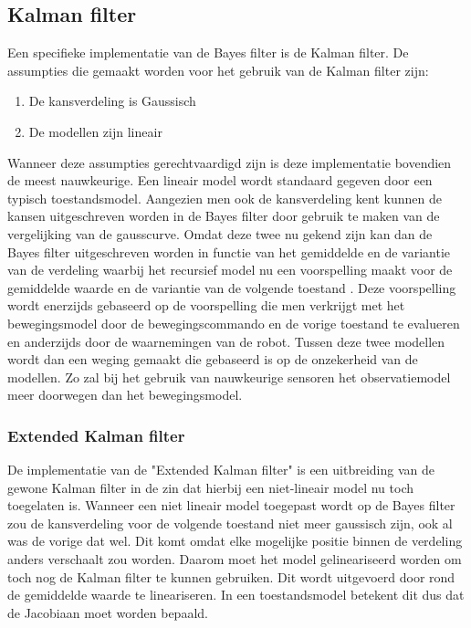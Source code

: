 \subsection{Kalman filter}
Een specifieke implementatie van de Bayes filter is de Kalman filter. De assumpties die gemaakt worden voor het gebruik van de Kalman filter zijn:
\begin{enumerate}
	\item De kansverdeling is Gaussisch
	\item De modellen zijn lineair
\end{enumerate}
Wanneer deze assumpties gerechtvaardigd zijn is deze implementatie bovendien de meest nauwkeurige.
Een lineair model wordt standaard gegeven door een typisch toestandsmodel. %
Aangezien men ook de kansverdeling kent kunnen de kansen uitgeschreven worden in de Bayes filter door gebruik te maken van de vergelijking van de gausscurve. Omdat deze twee nu gekend zijn kan dan de Bayes filter uitgeschreven worden in functie van het gemiddelde en de variantie van de verdeling waarbij het recursief model nu een voorspelling maakt voor de gemiddelde waarde en de variantie van de volgende toestand \cite{kalman}. Deze voorspelling wordt enerzijds gebaseerd op de voorspelling die men verkrijgt met het bewegingsmodel door de bewegingscommando en de vorige toestand te evalueren en anderzijds door de waarnemingen van de robot. Tussen deze twee modellen wordt dan een weging gemaakt die gebaseerd is op de onzekerheid van de modellen. Zo zal bij het gebruik van nauwkeurige sensoren het observatiemodel meer doorwegen dan het bewegingsmodel.

\subsubsection{Extended Kalman filter}
De implementatie van de "Extended Kalman filter" is een uitbreiding van de gewone Kalman filter in de zin dat hierbij een niet-lineair model nu toch toegelaten is. Wanneer een niet lineair model toegepast wordt op de Bayes filter zou de kansverdeling voor de volgende toestand niet meer gaussisch zijn, ook al was de vorige dat wel. Dit komt omdat elke mogelijke positie binnen de verdeling anders verschaalt zou worden. Daarom moet het model gelineariseerd worden om toch nog de Kalman filter te kunnen gebruiken. Dit wordt uitgevoerd door rond de gemiddelde waarde te lineariseren. In een toestandsmodel betekent dit dus dat de Jacobiaan moet worden bepaald. \cite{controltheory}
